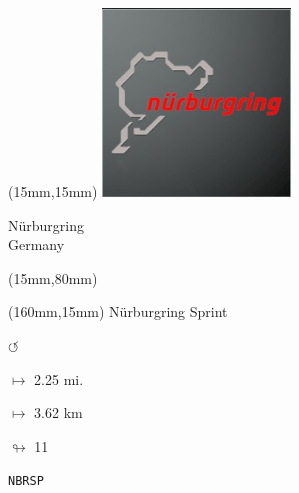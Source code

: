 \begin{textblock*}{50mm}(15mm,15mm)%
\includegraphics[width=50mm]{LG/2015-05-20_00089.png}
\par Nürburgring\\ Germany
\end{textblock*}
\begin{textblock*}{185mm}(15mm,80mm)%
\end{textblock*}
\begin{textblock*}{40mm}(160mm,15mm)%
Nürburgring Sprint
\par \Huge$\circlearrowleft$
\Large
\par$\mapsto$ 2.25 mi.
\par$\mapsto$ 3.62 km
\par$\looparrowright$ 11
\par\hfill\tiny\tt NBRSP\\
\end{textblock*}
\null\newpage

